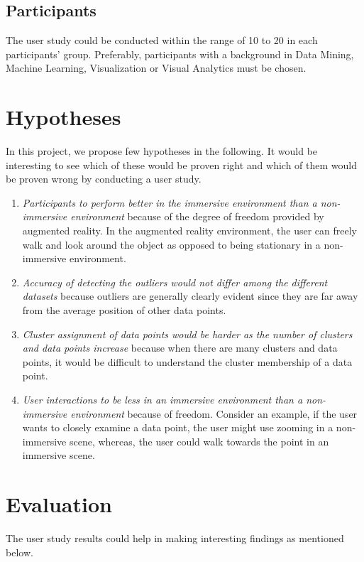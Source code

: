 \documentclass[journal]{vgtc}                %
\begin{document}
\subsection{Participants}
The user study could be conducted within the range of 10 to 20 in each participants' group. Preferably, participants with a background in Data Mining, Machine Learning, Visualization or Visual Analytics must be chosen.

\section{Hypotheses}
In this project, we propose few hypotheses in the following. It would be interesting to see which of these would be proven right and which of them would be proven wrong by conducting a user study.
\begin{enumerate}
    \item \textit{Participants to perform better in the immersive environment than a non-immersive environment} because of the degree of freedom provided by augmented reality. In the augmented reality environment, the user can freely walk and look around the object as opposed to being stationary in a non-immersive environment.
    \item \textit{Accuracy of detecting the outliers would not differ among the different datasets} because outliers are generally clearly evident since they are far away from the average position of other data points.
    \item \textit{Cluster assignment of data points would be harder as the number of clusters and data points increase} because when there are many clusters and data points, it would be difficult to understand the cluster membership of a data point.
    \item \textit{User interactions to be less in an immersive environment than a non-immersive environment} because of freedom. Consider an example, if the user wants to closely examine a data point, the user might use zooming in a non-immersive scene, whereas, the user could walk towards the point in an immersive scene.
\end{enumerate}

\section{Evaluation}

The user study results could help in making interesting findings as mentioned below.
\end{document}
